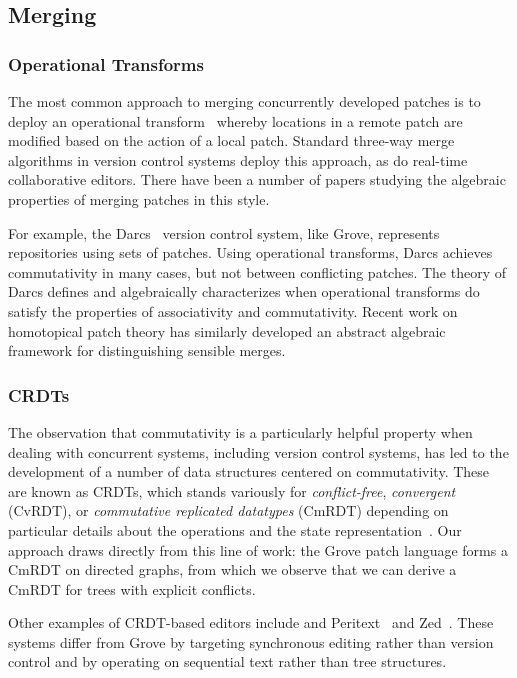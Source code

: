 \subsection{Merging}
\subsubsection{Operational Transforms}
The most common approach to merging concurrently developed patches is to deploy an operational transform~\cite{DBLP:conf/sigmod/EllisG89} whereby locations in a remote patch are modified based on the action of a local patch. Standard three-way merge algorithms in version control systems deploy this approach, as do real-time collaborative editors. There have been a number of papers studying the algebraic properties of merging patches in this style. 

For example, the Darcs~\cite{DBLP:conf/haskell/Roundy05} version control system, like Grove, represents repositories using sets of patches. Using operational transforms, Darcs achieves commutativity in many cases, but not between conflicting patches. The theory of Darcs defines and algebraically characterizes when operational transforms do satisfy the properties of associativity and commutativity. Recent work on homotopical patch theory \cite{DBLP:journals/jfp/AngiuliMLH16} has similarly developed an abstract algebraic framework for distinguishing sensible merges. 

\subsubsection{CRDTs}

The observation that commutativity is a particularly helpful property when dealing with concurrent systems, including version control systems, has led to the development of a number of data structures centered on commutativity. These are known as CRDTs, which stands variously for \emph{conflict-free}, \emph{convergent} (CvRDT), or \emph{commutative replicated datatypes} (CmRDT) depending on particular details about the operations and the state representation~\cite{shapiro2011conflict}.
Our approach draws directly from this line of work: the Grove patch language forms a CmRDT on directed graphs, from which we observe that we can derive a CmRDT for trees with explicit conflicts.

Other examples of CRDT-based editors include and Peritext~\cite{DBLP:journals/pacmhci/LittLKH22} and Zed~\cite{zed-blog}. These systems differ from Grove by targeting synchronous editing rather than version control and by operating on sequential text rather than tree structures.

